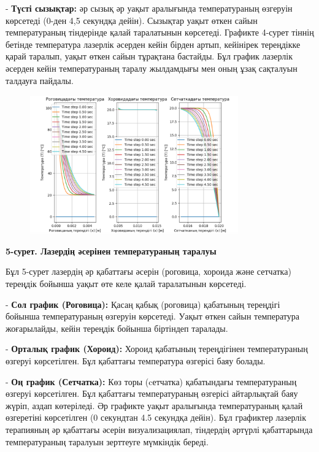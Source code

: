 - {\bfseries Түсті сызықтар:} әр сызық әр уақыт аралығында температураның
өзгеруін көрсетеді (0-ден 4,5 секундқа дейін). Сызықтар уақыт өткен
сайын температураның тіндерінде қалай таралатынын көрсетеді.
Графикте 4-сурет тіннің бетінде температура лазерлік әсерден кейін
бірден артып, кейінірек тереңдікке қарай таралып, уақыт өткен сайын
тұрақтана бастайды. Бұл график лазерлік әсерден кейін температураның
таралу жылдамдығы мен оның ұзақ сақталуын талдауға пайдалы.


\begin{figure}[H]
	\centering
	\includegraphics[width=0.8\textwidth]{media/ict/image24}
	\caption*{}
\end{figure}


{\bfseries 5-сурет. Лазердің әсерінен температураның таралуы}

Бұл 5-сурет лазердің әр қабаттағы әсерін (роговица, хороида және
сетчатка) тереңдік бойынша уақыт өте келе қалай таралатынын көрсетеді.


- {\bfseries Сол график (Роговица):} Қасаң қабық (роговица) қабатының
тереңдігі бойынша температураның өзгеруін көрсетеді. Уақыт өткен сайын
температура жоғарылайды, кейін тереңдік бойынша біртіндеп таралады.

- {\bfseries Орталық график (Хороид):} Хороид қабатының тереңдігінен
температураның өзгеруі көрсетілген. Бұл қабаттағы температура өзгерісі
баяу болады.

- {\bfseries Оң график (Сетчатка):} Көз торы (cетчатка) қабатындағы
температураның өзгеруі көрсетілген. Бұл қабаттағы температураның
өзгерісі айтарлықтай баяу жүріп, аздап көтеріледі.
Әр графикте уақыт аралығында температураның қалай өзгеретіні көрсетілген
(0 секундтан 4.5 секундқа дейін). Бұл графиктер лазерлік терапияның әр
қабаттағы әсерін визуализациялап, тіндердің әртүрлі қабаттарында
температураның таралуын зерттеуге мүмкіндік береді.

